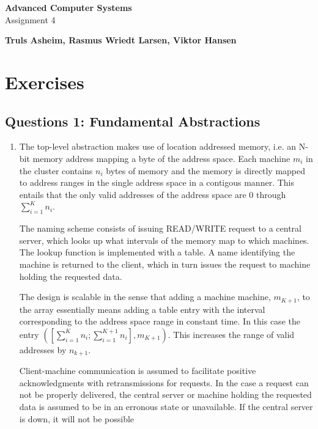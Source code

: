 \documentclass[11pt,a4paper,english]{article}
\begin{document}
\thispagestyle{empty} %
\hspace{6cm} \vspace{6cm}
\begin{center}
\textbf{\Huge {Advanced Computer Systems}}\\ \vspace{0.5cm}
\Large{Assignment 4}
\end{center}
\vspace{3cm}
\begin{center}
\Large{\textbf{Truls Asheim, Rasmus Wriedt Larsen, Viktor Hansen}}
\end{center}
\vspace{6.0cm}
\thispagestyle{empty}

\newpage

\section{Exercises}
\subsection{Questions 1: Fundamental Abstractions}
\begin{enumerate}
\item{
The top-level abstraction makes use of location addressed memory, i.e. an N-bit memory address mapping a byte of the address space. Each machine $m_i$ in the cluster contains $n_i$ bytes of memory and the memory is directly mapped to address ranges in the single address space in a contigous manner. This entails that the only valid addresses of the address space are 0 through $\sum_{i=1}^{K} n_{i}$.

The naming scheme consists of issuing READ/WRITE request to a central server, which looks up what intervals of the memory map to which machines. The lookup function is implemented with a table. A name identifying the machine is returned to the client, which in turn issues the request to machine holding the requested data.

The design is scalable in the sense that adding a machine machine, $m_{K+1}$, to the array essentially means adding a table entry with the interval corresponding to the address space range in constant time. In this case the entry $([\sum_{i=1}^{K} n_{i}; \sum_{i=1}^{K+1} n_{i}], m_{K+1})$. This increases the range of valid addresses by $n_{k+1}$.

Client-machine communication is assumed to facilitate positive acknowledgments with retransmissions for requests. In the case a request can not be properly delivered, the central server or machine holding the requested data is assumed to be in an erronous state or unavailable. If the central server is down, it will not be possible}
\end{enumerate}
\end{document}

